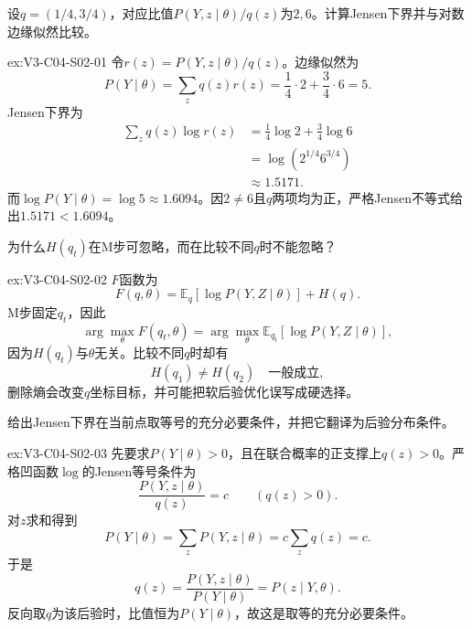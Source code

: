 \begin{SLChapterExercisePairSection}
\begin{exercise}\label{ex:V3-C04-S02-01}
设$q=(1/4,3/4)$，对应比值$P(Y,z\mid\theta)/q(z)$为$2,6$。计算Jensen下界并与对数边缘似然比较。
\end{exercise}
\ifSLFullEdition
{}\label{sol:V3-C04-S02-01}
\begin{chapterexercisesolution}{ex:V3-C04-S02-01}
令$r(z)=P(Y,z\mid\theta)/q(z)$。边缘似然为
\[
P(Y\mid\theta)=\sum_zq(z)r(z)
=\frac14\cdot2+\frac34\cdot6=5.
\]
Jensen下界为
\[
\begin{aligned}
\sum_zq(z)\log r(z)
&=\frac14\log2+\frac34\log6\\
&=\log\!\left(2^{1/4}6^{3/4}\right)\\
&\approx1.5171.
\end{aligned}
\]
而$\log P(Y\mid\theta)=\log5\approx1.6094$。因$2\neq6$且$q$两项均为正，严格Jensen不等式给出$1.5171<1.6094$。
\end{chapterexercisesolution}
\fi

\begin{exercise}\label{ex:V3-C04-S02-02}
为什么$H(q_t)$在M步可忽略，而在比较不同$q$时不能忽略？
\end{exercise}
\ifSLFullEdition
{}\label{sol:V3-C04-S02-02}
\begin{chapterexercisesolution}{ex:V3-C04-S02-02}
$F$函数为
\[
F(q,\theta)=\mathbb E_q[\log P(Y,Z\mid\theta)]+H(q).
\]
M步固定$q_t$，因此
\[
\arg\max_{\theta}F(q_t,\theta)
=\arg\max_{\theta}\mathbb E_{q_t}[\log P(Y,Z\mid\theta)],
\]
因为$H(q_t)$与$\theta$无关。比较不同$q$时却有
\[
H(q_1)\neq H(q_2)\quad\text{一般成立},
\]
删除熵会改变$q$坐标目标，并可能把软后验优化误写成硬选择。
\end{chapterexercisesolution}
\fi

\begin{exercise}\label{ex:V3-C04-S02-03}
给出Jensen下界在当前点取等号的充分必要条件，并把它翻译为后验分布条件。
\end{exercise}
\ifSLFullEdition
{}\label{sol:V3-C04-S02-03}
\begin{chapterexercisesolution}{ex:V3-C04-S02-03}
先要求$P(Y\mid\theta)>0$，且在联合概率的正支撑上$q(z)>0$。严格凹函数$\log$的Jensen等号条件为
\[
\frac{P(Y,z\mid\theta)}{q(z)}=c
\qquad(q(z)>0).
\]
对$z$求和得到
\[
P(Y\mid\theta)=\sum_zP(Y,z\mid\theta)
=c\sum_zq(z)=c.
\]
于是
\[
q(z)=\frac{P(Y,z\mid\theta)}{P(Y\mid\theta)}
=P(z\mid Y,\theta).
\]
反向取$q$为该后验时，比值恒为$P(Y\mid\theta)$，故这是取等的充分必要条件。
\end{chapterexercisesolution}
\fi


\end{SLChapterExercisePairSection}
